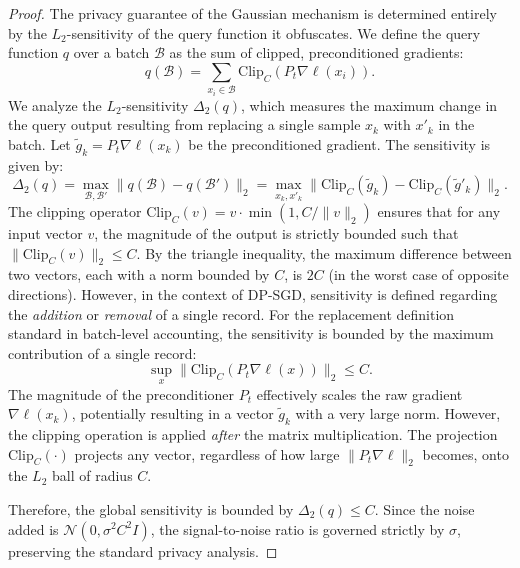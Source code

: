 \documentclass{article}
\theoremstyle{plain}
\theoremstyle{definition}
\theoremstyle{remark}
\begin{document}
\begin{proof}
The privacy guarantee of the Gaussian mechanism is determined entirely by the $L_2$-sensitivity of the query function it obfuscates. We define the query function $q$ over a batch $\mathcal{B}$ as the sum of clipped, preconditioned gradients:
\begin{equation}
    q(\mathcal{B}) = \sum_{x_i \in \mathcal{B}} \text{Clip}_C(P_t \nabla \ell(x_i)).
\end{equation}
We analyze the $L_2$-sensitivity $\Delta_2(q)$, which measures the maximum change in the query output resulting from replacing a single sample $x_k$ with $x'_k$ in the batch. Let $\tilde{g}_k = P_t \nabla \ell(x_k)$ be the preconditioned gradient. The sensitivity is given by:
\begin{equation}
    \Delta_2(q) = \max_{\mathcal{B}, \mathcal{B}'} \| q(\mathcal{B}) - q(\mathcal{B}') \|_2 = \max_{x_k, x'_k} \| \text{Clip}_C(\tilde{g}_k) - \text{Clip}_C(\tilde{g}'_k) \|_2.
\end{equation}
The clipping operator $\text{Clip}_C(v) = v \cdot \min(1, C/\|v\|_2)$ ensures that for any input vector $v$, the magnitude of the output is strictly bounded such that $\|\text{Clip}_C(v)\|_2 \le C$. By the triangle inequality, the maximum difference between two vectors, each with a norm bounded by $C$, is $2C$ (in the worst case of opposite directions). However, in the context of DP-SGD, sensitivity is defined regarding the \textit{addition} or \textit{removal} of a single record. For the replacement definition standard in batch-level accounting, the sensitivity is bounded by the maximum contribution of a single record:
\begin{equation}
    \sup_{x} \| \text{Clip}_C(P_t \nabla \ell(x)) \|_2 \le C.
\end{equation}
The magnitude of the preconditioner $P_t$ effectively scales the raw gradient $\nabla \ell(x_k)$, potentially resulting in a vector $\tilde{g}_k$ with a very large norm. However, the clipping operation is applied \textit{after} the matrix multiplication. The projection $\text{Clip}_C(\cdot)$ projects any vector, regardless of how large $\|P_t \nabla \ell\|_2$ becomes, onto the $L_2$ ball of radius $C$. 

Therefore, the global sensitivity is bounded by $\Delta_2(q) \le C$. Since the noise added is $\mathcal{N}(0, \sigma^2 C^2 I)$, the signal-to-noise ratio is governed strictly by $\sigma$, preserving the standard privacy analysis.
\end{proof}
\end{document}
